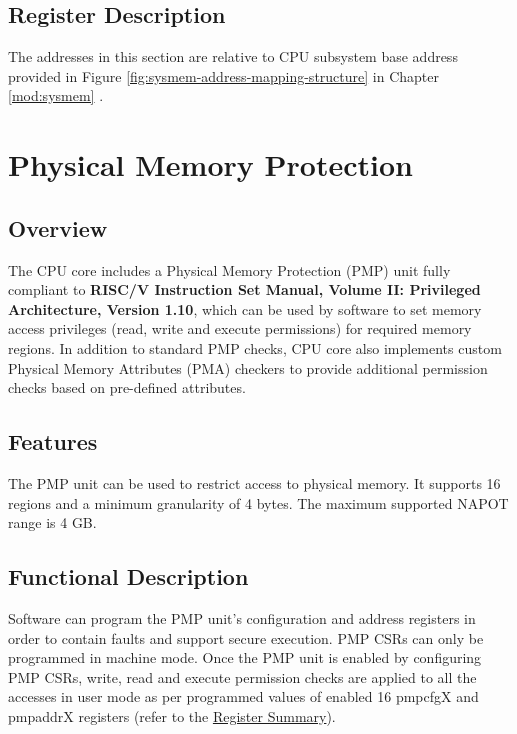 \documentclass[main\_\_EN.tex]{subfiles}
\begin{document}

\subsection{Register Description}

The addresses in this section are relative to CPU subsystem base address provided in Figure \ref{fig:sysmem-address-mapping-structure} in Chapter \ref{mod:sysmem} \textit{}.




\clearpage
\section{Physical Memory Protection}
\label{sec:riscvcpu-pmp}

\subsection{Overview}
\label{sec:riscvcpu-pmp-overview}
The CPU core includes a Physical Memory Protection (PMP) unit fully compliant to \textbf{RISC\-/V Instruction Set Manual, Volume II: Privileged Architecture, Version 1.10}, which can be used by software to set memory access privileges (read, write and execute permissions) for required memory regions. In addition to standard PMP checks, CPU core also implements custom Physical Memory Attributes (PMA) checkers to provide additional permission checks based on pre-defined attributes.

\subsection{Features}
\label{sec:riscvcpu-pmp-features}
The PMP unit can be used to restrict access to physical memory. It supports 16 regions and a minimum granularity of 4 bytes. The maximum supported NAPOT range is 4 GB.

\subsection{Functional Description}
\label{sec:riscvcpu-pmp-func-descr}

Software can program the PMP unit's configuration and address registers in order to contain faults and support secure execution. PMP CSRs can only be programmed in machine mode. Once the PMP unit is enabled by configuring PMP CSRs, write, read and execute permission checks are applied to all the accesses in user mode as per programmed values of enabled 16 pmpcfgX and pmpaddrX registers (refer to the \hyperref[sec:riscvcpu-pmp-reg-summ]{Register Summary}).
\end{document}
